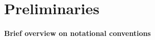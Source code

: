 \let\textcircled=\pgftextcircled
\chapter{Preliminaries}
\label{chap:prelim}


\bigskip

\subsubsection*{Brief overview on notational conventions}


